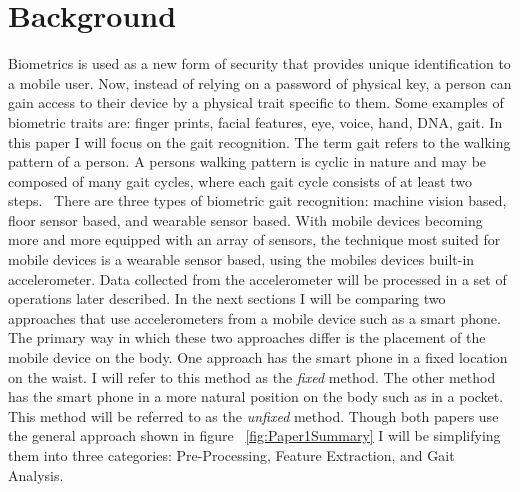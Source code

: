\documentclass{sig-alternate}
\begin{document}
\section{Background}
	Biometrics is used as a new form of security that provides unique identification to a mobile user. Now, instead of relying on a password of physical key, a person can gain access to their device by a physical trait specific to them. Some examples of biometric traits are: finger prints, facial features, eye, voice, hand, DNA, gait. In this paper I will focus on the gait recognition. The term gait refers to the walking pattern of a person. A persons walking pattern is cyclic in nature and may be composed of many gait cycles, where each gait cycle consists of at least two steps.~\cite{Sujithra:2012} 
	There are three types of biometric gait recognition: machine vision based, floor sensor based, and wearable sensor based. With mobile devices becoming more and more equipped with an array of sensors, the technique most suited for mobile devices is a wearable sensor based, using the mobiles devices built-in accelerometer. Data collected from the accelerometer will be processed in a set of operations later described. 
	In the next sections I will be comparing two approaches that use accelerometers from a mobile device such as a smart phone. The primary way in which these two approaches differ is the placement of the mobile device on the body. One approach has the smart phone in a fixed location on the waist. I will refer to this method as the \textit{fixed} method. The other method has the smart phone in a more natural position on the body such as in a pocket. This method will be referred to as the \textit{unfixed} method. Though both papers use the general approach shown in figure ~\ref{fig:Paper1Summary} I will be simplifying them into three categories: Pre-Processing, Feature Extraction, and Gait Analysis. 
\end{document}
